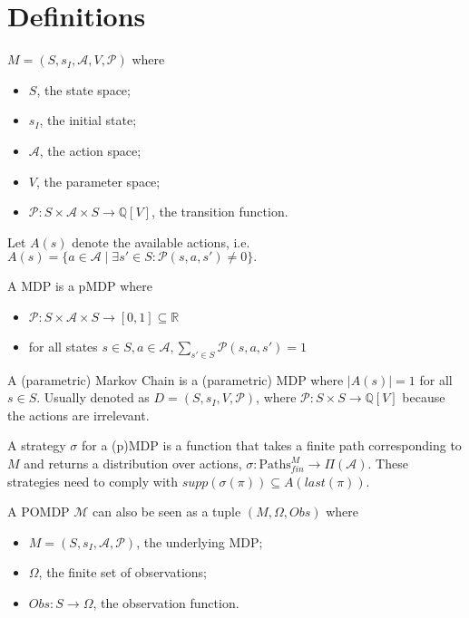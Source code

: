 \section{Definitions}

\begin{definition}
 $M=(S,s_I,\mathcal{A},V,\mathcal{P})$ where
 \begin{itemize}
 	\item $S$, the state space;
 	\item $s_I$, the initial state;
 	\item $\mathcal{A}$, the action space;
 	\item $V$, the parameter space;
 	\item $\mathcal{P}:S\times \mathcal{A} \times S \to \mathbb{Q}[V]$, the transition function.
 \end{itemize}
\end{definition}

Let $A(s)$ denote the available actions, i.e. $A(s)=\{a\in \mathcal{A} \mid \exists s'\in S: \mathcal{P}(s,a,s')\neq 0 \}.$

\begin{definition}[MDP]
	A MDP is a pMDP where 
	\begin{itemize}
		\item $\mathcal{P}:S\times\mathcal{A}\times S \to [0,1]\subseteq\mathbb{R}$
		\item for all states $s\in S, a\in\mathcal{A},\sum_{s'\in S}\mathcal{P}(s,a,s')=1$
	\end{itemize}
\end{definition}

\begin{definition}[pMC]
	A (parametric) Markov Chain is a (parametric) MDP where $|A(s)|=1$ for all $s\in S$.  Usually denoted as $D=(S,s_I,V,\mathcal{P})$, where $\mathcal{P}:S\times S\to \mathbb{Q}[V]$ because the actions are irrelevant. 
\end{definition}


\begin{definition}[Strategy]
	A strategy $\sigma$ for a (p)MDP is a function that takes a finite path corresponding to $M$ and returns a distribution over actions, $\sigma:\text{Paths}^M_{fin}\to \Pi(\mathcal{A})$. These strategies need to comply with $supp(\sigma(\pi))\subseteq A(last(\pi))$.
\end{definition}

\begin{definition}[POMDP]
	A POMDP $\mathcal{M}$ can also be seen as a tuple $(M,\Omega,Obs)$ where
	\begin{itemize}
		\item $M=(S,s_I,\mathcal{A},\mathcal{P})$, the underlying MDP;
		\item $\Omega$, the finite set of observations;
		\item $Obs: S\to\Omega$, the observation function.
	\end{itemize}
\end{definition}

